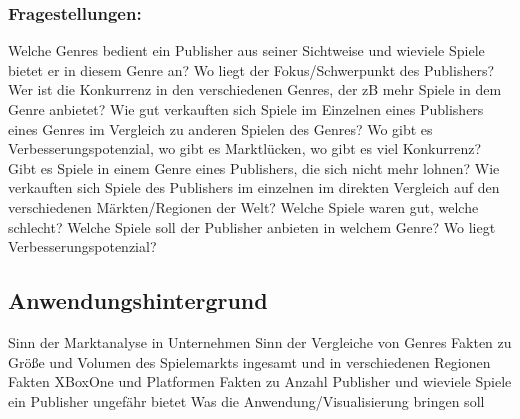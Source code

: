 \documentclass[usegeometry=true]{scrartcl}
\begin{document}
\subsubsection {Fragestellungen:} 
 Welche Genres bedient ein Publisher aus seiner Sichtweise und wieviele Spiele bietet er in diesem Genre an? Wo liegt der Fokus/Schwerpunkt des Publishers? Wer ist die Konkurrenz in den verschiedenen Genres, der zB mehr Spiele in dem Genre anbietet?
 Wie gut verkauften sich Spiele im Einzelnen eines Publishers eines Genres im Vergleich zu anderen Spielen des Genres? Wo gibt es Verbesserungspotenzial, wo gibt es Marktlücken, wo gibt es viel Konkurrenz? Gibt es Spiele in einem Genre eines Publishers, die sich nicht mehr lohnen?
 Wie verkauften sich Spiele des Publishers im einzelnen im direkten Vergleich auf den verschiedenen Märkten/Regionen der Welt?
 Welche Spiele waren gut, welche schlecht? Welche Spiele soll der Publisher anbieten in welchem Genre? Wo liegt Verbesserungspotenzial?


\subsection{Anwendungshintergrund}
Sinn der Marktanalyse in Unternehmen
Sinn der Vergleiche von Genres
Fakten zu Größe und Volumen des Spielemarkts ingesamt und in verschiedenen Regionen
Fakten XBoxOne und Platformen 
Fakten zu Anzahl Publisher und wieviele Spiele ein Publisher ungefähr bietet
Was die Anwendung/Visualisierung bringen soll

\end{document}
